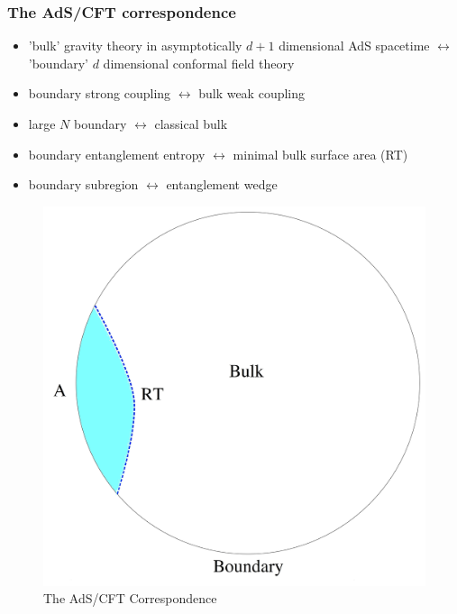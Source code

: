 \documentclass[10pt,aspectratio=169]{beamer}
\begin{document}
\begin{frame}
\frametitle{The AdS/CFT correspondence}

\begin{minipage}[t]{0.48\linewidth}

\begin{itemize}

\item 'bulk' gravity theory in asymptotically $d+1$ dimensional AdS spacetime $\leftrightarrow$ 'boundary' $d$ dimensional conformal field theory

\item boundary strong coupling $\leftrightarrow$ bulk weak coupling

\item large $N$ boundary $\leftrightarrow$ classical bulk

\item boundary entanglement entropy $\leftrightarrow$ minimal bulk surface area (RT)

\item boundary subregion $\leftrightarrow$ entanglement wedge

\end{itemize}

\end{minipage}
%
\hfill
%
\begin{minipage}[t]{0.48\linewidth}

\begin{figure}
    \begin{center}
    
        \includegraphics[scale=0.06]{adscft5}    
    
    \end{center}
    \caption{The AdS/CFT Correspondence}
\end{figure}

\end{minipage}

\end{frame}
\end{document}
